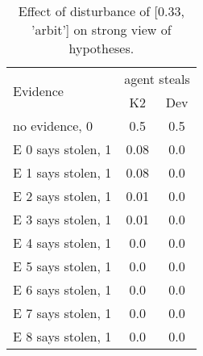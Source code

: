 \begin{table}\begin{tabular}{l|cc}\toprule\multirow{2}{*}{Evidence} & \multicolumn{2}{c}{agent steals}\\& {K2} & {Dev}\\\midrule
no evidence, 0 & 0.5&0.5\\E 0 says stolen, 1 & \cellcolor{Bittersweet}0.08&\cellcolor{Bittersweet}0.0\\E 1 says stolen, 1 & \cellcolor{Bittersweet}0.08&\cellcolor{Bittersweet}0.0\\E 2 says stolen, 1 & 0.01&0.0\\E 3 says stolen, 1 & 0.01&0.0\\E 4 says stolen, 1 & 0.0&0.0\\E 5 says stolen, 1 & 0.0&0.0\\E 6 says stolen, 1 & 0.0&0.0\\E 7 says stolen, 1 & 0.0&0.0\\E 8 says stolen, 1 & 0.0&0.0\\\bottomrule\end{tabular}\caption{Effect of disturbance of [0.33, 'arbit'] on strong view of hypotheses.}\end{table}